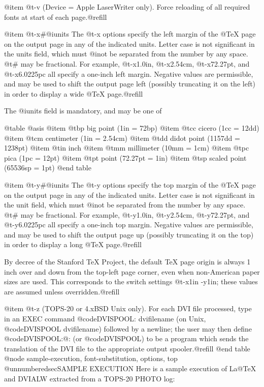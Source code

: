 {@item @t{-v}
(Device = Apple LaserWriter only).  Force reloading of all
required fonts at start of each page.@refill

@item @t{-x#}@i{units}
The @t{-x} options specify the left margin of the @TeX{} page
on the output page in any of the indicated units.  Letter
case is not significant in the units field, which must @i{not}
be separated from the number by any space.  @t{#} may be
fractional.  For example, @t{-x1.0in}, @t{-x2.54cm},
@t{-x72.27pt}, and @t{-x6.0225pc} all specify a one-inch left
margin.  Negative values are permissible, and may be used to
shift the output page left (possibly truncating it on the
left) in order to display a wide @TeX{} page.@refill

The @i{units} field is mandatory, and may be one of

@table @asis
@item @t{bp}
big point (1in = 72bp)
@item @t{cc}
cicero (1cc = 12dd)
@item @t{cm}
centimeter (1in = 2.54cm)
@item @t{dd}
didot point (1157dd = 1238pt)
@item @t{in}
inch
@item @t{mm}
millimeter (10mm = 1cm)
@item @t{pc}
pica (1pc = 12pt)
@item @t{pt}
point (72.27pt = 1in)
@item @t{sp}
scaled point (65536sp = 1pt)
@end table

@item @t{-y#}@i{units}
The @t{-y} options specify the top margin of the @TeX{} page
on the output page in any of the indicated units.  Letter
case is not significant in the unit field, which must @i{not}
be separated from the number by any space.  @t{#} may be
fractional.  For example, @t{-y1.0in}, @t{-y2.54cm},
@t{-y72.27pt}, and @t{-y6.0225pc} all specify a one-inch top
margin.  Negative values are permissible, and may be used to
shift the output page up (possibly truncating it on the top)
in order to display a long @TeX{} page.@refill


By decree of the Stanford TeX Project, the default TeX
page origin is always 1 inch over and down from the
top-left page corner, even when non-American paper sizes
are used.  This corresponds to the switch settings
@t{-x1in -y1in}; these values are assumed unless
overridden.@refill

@item @t{-z}
(TOPS-20 or 4.xBSD Unix only).  For each DVI file
processed, type in an EXEC command @code{DVISPOOL:
dvifilename} (on Unix, @code{DVISPOOL dvifilename}) followed
by a newline; the user may then define @code{DVISPOOL:}@: (or
@code{DVISPOOL}) to be a program which sends the translation
of the DVI file to the appropriate output spooler.@refill
@end table

@node sample-execution, font-substitution, options, top
@unnumberedsec{SAMPLE EXECUTION}
Here is a sample execution of La@TeX{} and DVIALW extracted from
a TOPS-20 PHOTO log:

}

